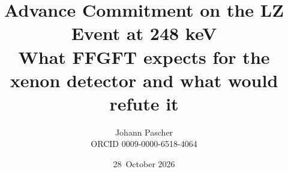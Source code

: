 \documentclass[11pt,a4paper]{report}
\title{Advance Commitment on the LZ Event at 248 keV\\[0.5em]
  \large What FFGFT expects for the xenon detector and what would refute it}
\date{28~October 2026}
\author{Johann Pascher\\\small ORCID 0009-0000-6518-4064}
\begin{document}
\renewcommand{\thechapter}{}
\renewcommand{\thesection}{\arabic{section}}
\maketitle
\tableofcontents

\end{document}
